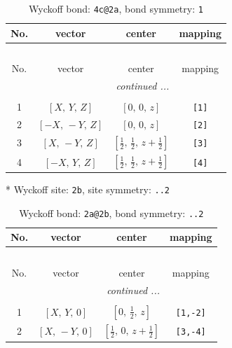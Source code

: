 \documentclass[fleqn,8pt]{jsarticle}
\begin{document}
\renewcommand{\arraystretch}{1.2}
\begin{longtable}{cccc}
\caption{Wyckoff bond: {\tt 4c@2a}, bond symmetry: {\tt 1}}
 \\
 \hline \hline
No. & vector & center & mapping \\ \hline \endfirsthead

\multicolumn{3}{l}{\tablename\ \thetable{}} \\
 \hline \hline
No. & vector & center & mapping \\ \hline \endhead

 \hline \hline
\multicolumn{3}{r}{\footnotesize\it continued ...} \\ \endfoot

 \hline \hline
\multicolumn{3}{r}{} \\ \endlastfoot

1 & $\left[ X,\, Y,\, Z \right]$ & $\left[ 0,\, 0,\, z \right]$ & {\tt [1]} \\ \hline
2 & $\left[ - X,\, - Y,\, Z \right]$ & $\left[ 0,\, 0,\, z \right]$ & {\tt [2]} \\ \hline
3 & $\left[ X,\, - Y,\, Z \right]$ & $\left[ \frac{1}{2},\, \frac{1}{2},\, z + \frac{1}{2} \right]$ & {\tt [3]} \\ \hline
4 & $\left[ - X,\, Y,\, Z \right]$ & $\left[ \frac{1}{2},\, \frac{1}{2},\, z + \frac{1}{2} \right]$ & {\tt [4]} \\
\end{longtable}
* Wyckoff site: {\tt 2b}, site symmetry: {\tt ..2}
\renewcommand{\arraystretch}{1.2}
\begin{longtable}{cccc}
\caption{Wyckoff bond: {\tt 2a@2b}, bond symmetry: {\tt ..2}}
 \\
 \hline \hline
No. & vector & center & mapping \\ \hline \endfirsthead

\multicolumn{3}{l}{\tablename\ \thetable{}} \\
 \hline \hline
No. & vector & center & mapping \\ \hline \endhead

 \hline \hline
\multicolumn{3}{r}{\footnotesize\it continued ...} \\ \endfoot

 \hline \hline
\multicolumn{3}{r}{} \\ \endlastfoot

1 & $\left[ X,\, Y,\, 0 \right]$ & $\left[ 0,\, \frac{1}{2},\, z \right]$ & {\tt [1,-2]} \\ \hline
2 & $\left[ X,\, - Y,\, 0 \right]$ & $\left[ \frac{1}{2},\, 0,\, z + \frac{1}{2} \right]$ & {\tt [3,-4]} \\
\end{longtable}
\end{document}
